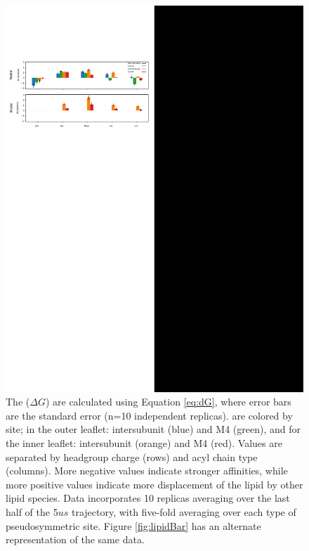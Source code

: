 \begin{figure}[!h]
	\center
	\includegraphics[width=\linewidth]{./Figures/Protein_centric.pdf}
	\caption[\Newaffinities{} organized to reveal site selectivity.] {The \newaffinities ($\Delta G$) are calculated using Equation \ref{eq:dG}, where error bars are the standard error (n=10 independent replicas).  \Newaffinities are colored by site; in the outer leaflet: intersubunit (blue) and  M4 (green), and for the inner leaflet: intersubunit (orange) and M4 (red). Values are separated by headgroup charge (rows) and acyl chain type (columns). More negative values indicate stronger affinities, while more positive values indicate more displacement of the lipid by other lipid species. Data incorporates 10 replicas averaging over the last half of the 5$us$ trajectory, with five-fold averaging over each type of pseudosymmetric site. Figure \ref{fig:lipidBar} has an alternate representation of the same data.  }  %
	\label{fig:proBar}
\end{figure}

